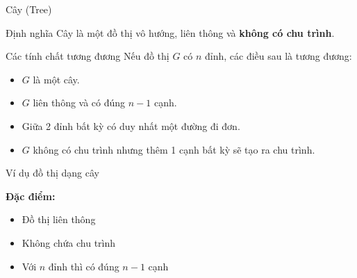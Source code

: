 \documentclass{beamer}
\begin{document}
\begin{frame}{Cây (Tree)}

\begin{block}{Định nghĩa}
Cây là một đồ thị vô hướng, liên thông và \textbf{không có chu trình}.
\end{block}

\pause

\begin{alertblock}{Các tính chất tương đương}
Nếu đồ thị $G$ có $n$ đỉnh, các điều sau là tương đương:
\begin{itemize}
\item $G$ là một cây.
\item $G$ liên thông và có đúng $n-1$ cạnh.
\item Giữa 2 đỉnh bất kỳ có duy nhất một đường đi đơn.
\item $G$ không có chu trình nhưng thêm 1 cạnh bất kỳ sẽ tạo ra chu trình.
\end{itemize}
\end{alertblock}

\end{frame}


\begin{frame}{Ví dụ đồ thị dạng cây}

\centering


\vspace{0.5cm}

\textbf{Đặc điểm:}
\begin{itemize}
\item Đồ thị liên thông
\item Không chứa chu trình
\item Với $n$ đỉnh thì có đúng $n-1$ cạnh
\end{itemize}

\end{frame}
\end{document}
